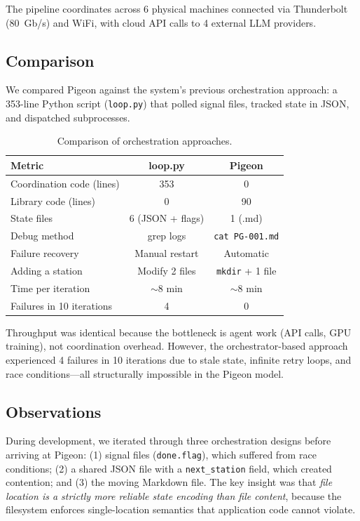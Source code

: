 \documentclass[11pt,a4paper]{article}
\begin{document}
The pipeline coordinates across 6 physical machines connected via Thunderbolt (80~Gb/s) and WiFi, with cloud API calls to 4 external LLM providers.

\subsection{Comparison}

We compared Pigeon against the system's previous orchestration approach: a 353-line Python script (\texttt{loop.py}) that polled signal files, tracked state in JSON, and dispatched subprocesses.

\begin{table}[h]
\centering
\begin{tabular}{lcc}
\toprule
\textbf{Metric} & \textbf{loop.py} & \textbf{Pigeon} \\
\midrule
Coordination code (lines) & 353 & 0 \\
Library code (lines) & 0 & 90 \\
State files & 6 (JSON + flags) & 1 (.md) \\
Debug method & grep logs & \texttt{cat PG-001.md} \\
Failure recovery & Manual restart & Automatic \\
Adding a station & Modify 2 files & \texttt{mkdir} + 1 file \\
Time per iteration & $\sim$8 min & $\sim$8 min \\
Failures in 10 iterations & 4 & 0 \\
\bottomrule
\end{tabular}
\caption{Comparison of orchestration approaches.}
\end{table}

Throughput was identical because the bottleneck is agent work (API calls, GPU training), not coordination overhead. However, the orchestrator-based approach experienced 4 failures in 10 iterations due to stale state, infinite retry loops, and race conditions---all structurally impossible in the Pigeon model.

\subsection{Observations}

During development, we iterated through three orchestration designs before arriving at Pigeon: (1) signal files (\texttt{done.flag}), which suffered from race conditions; (2) a shared JSON file with a \texttt{next\_station} field, which created contention; and (3) the moving Markdown file. The key insight was that \emph{file location is a strictly more reliable state encoding than file content}, because the filesystem enforces single-location semantics that application code cannot violate.
\end{document}
